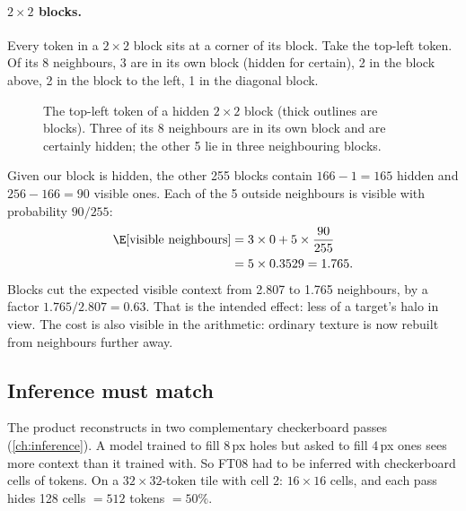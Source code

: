 \paragraph{$2\times2$ blocks.} Every token in a $2\times2$ block sits at a corner of its block. Take the
top-left token. Of its 8 neighbours, 3 are in its own block (hidden for certain), 2 in the block above, 2 in
the block to the left, 1 in the diagonal block.

\begin{figure}[htbp]
\centering
{}
\caption{The top-left token of a hidden $2\times2$ block (thick outlines are blocks). Three of its 8 neighbours
are in its own block and are certainly hidden; the other 5 lie in three neighbouring blocks.}
\label{fig:decoderwork:neighbours}
\end{figure}

Given our block is hidden, the other 255 blocks contain $166-1=165$ hidden and $256-166=90$ visible ones. Each of
the 5 outside neighbours is visible with probability $90/255$:
\begin{align*}
\E[\text{visible neighbours}] &= 3\times0 + 5\times\frac{90}{255}\\
&= 5\times0.3529 = 1.765.
\end{align*}
Blocks cut the expected visible context from 2.807 to 1.765 neighbours, by a factor $1.765/2.807=0.63$. That is
the intended effect: less of a target's halo in view. The cost is also visible in the arithmetic: ordinary
texture is now rebuilt from neighbours further away.

\subsection{Inference must match}

The product reconstructs in two complementary checkerboard passes (\cref{ch:inference}). A model trained to
fill 8\,px holes but asked to fill 4\,px ones sees more context than it trained with. So FT08 had to be inferred
with checkerboard cells of  tokens. On a $32\times32$-token tile with cell 2: $16\times16$ cells,
and each pass hides 128 cells $=512$ tokens $=50\%$.

